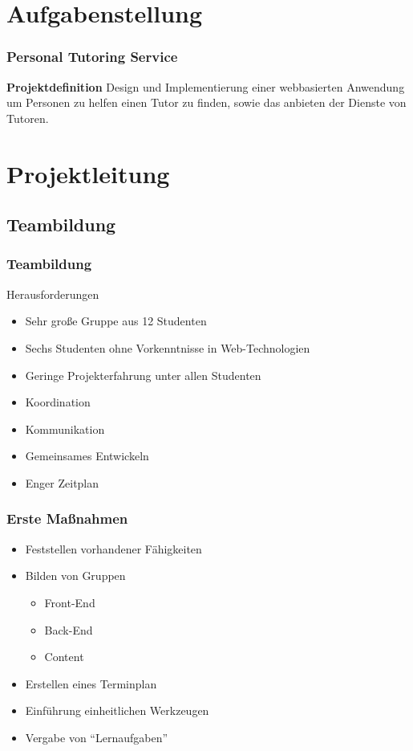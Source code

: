 \section{Aufgabenstellung} 
\begin{frame}
  \frametitle{Personal Tutoring Service} 
	\begin{block}{\textbf{Projektdefinition}}
	  {\small Design und Implementierung einer webbasierten Anwendung um Personen 
	  zu helfen einen Tutor zu finden, sowie das anbieten der Dienste von Tutoren.}
	\end{block}
\end{frame}

\section{Projektleitung} 
\subsection{Teambildung}

\begin{frame} 
  \frametitle{Teambildung}
  \begin{block}{Herausforderungen}
    \begin{itemize}
      \item Sehr große Gruppe aus 12 Studenten
      \item Sechs Studenten ohne Vorkenntnisse in Web-Technologien
      \item Geringe Projekterfahrung unter allen Studenten
      \item Koordination
      \item Kommunikation
      \item Gemeinsames Entwickeln
      \item Enger Zeitplan
    \end{itemize}
  \end{block}
\end{frame}

\begin{frame} 
  \frametitle{Erste Maßnahmen}
    \begin{itemize}
      \item Feststellen vorhandener Fähigkeiten
      \item Bilden von Gruppen
      \begin{itemize}
        \item Front-End
        \item Back-End
        \item Content
      \end{itemize}
      \item Erstellen eines Terminplan
      \item Einführung einheitlichen Werkzeugen
      \item Vergabe von ``Lernaufgaben''
    \end{itemize}
\end{frame}

